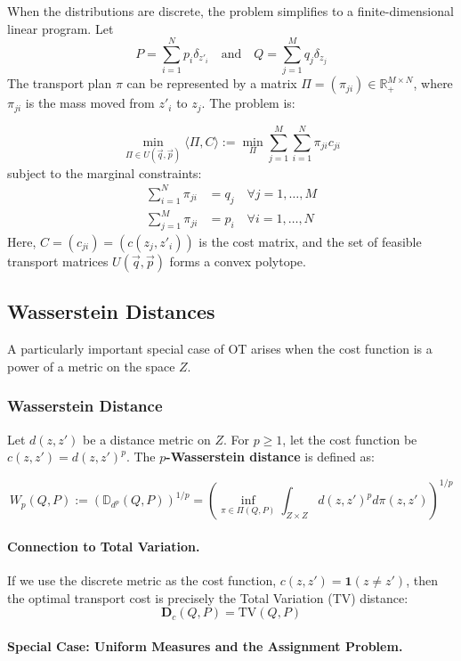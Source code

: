 \documentclass[12pt]{report}
\newcommand{\coloneqq}{\mathrel{:=}}
\begin{document}
When the distributions are discrete, the problem simplifies to a finite-dimensional linear program. Let
\[
P = \sum_{i=1}^N p_i \delta_{z'_i} \quad \text{and} \quad Q = \sum_{j=1}^M q_j \delta_{z_j}
\]
The transport plan $\pi$ can be represented by a matrix $\Pi = (\pi_{ji}) \in \mathbb{R}_+^{M \times N}$, where $\pi_{ji}$ is the mass moved from $z'_i$ to $z_j$. The problem is:

\[
\min_{\Pi \in U(\vec{q}, \vec{p})} \langle \Pi, C \rangle \coloneqq \min_{\Pi} \sum_{j=1}^M \sum_{i=1}^N \pi_{ji} c_{ji}
\]
subject to the marginal constraints:
\begin{align*}
\sum_{i=1}^N \pi_{ji} &= q_j \quad \forall j=1,\dots,M \\
\sum_{j=1}^M \pi_{ji} &= p_i \quad \forall i=1,\dots,N
\end{align*}
Here, $C = (c_{ji}) = (c(z_j, z'_i))$ is the cost matrix, and the set of feasible transport matrices $U(\vec{q}, \vec{p})$ forms a convex polytope.

\subsection{Wasserstein Distances}
A particularly important special case of OT arises when the cost function is a power of a metric on the space $Z$.

\subsubsection*{Wasserstein Distance}
Let $d(z, z')$ be a distance metric on $Z$. For $p \ge 1$, let the cost function be $c(z, z') = d(z, z')^p$. The \textbf{$p$-Wasserstein distance} is defined as:

\[
W_p(Q, P) \coloneqq \left( \mathbb{D}_{d^p}(Q, P) \right)^{1/p} = \left( \inf_{\pi \in \Pi(Q, P)} \int_{Z \times Z} d(z, z')^p d\pi(z, z') \right)^{1/p}
\]

\paragraph{Connection to Total Variation.}
If we use the discrete metric as the cost function, $c(z, z') = \mathbf{1}(z \neq z')$, then the optimal transport cost is precisely the Total Variation (TV) distance:
\[
\textbf{D}_c(Q, P) = \text{TV}(Q, P)
\]

\paragraph{Special Case: Uniform Measures and the Assignment Problem.}
\end{document}
